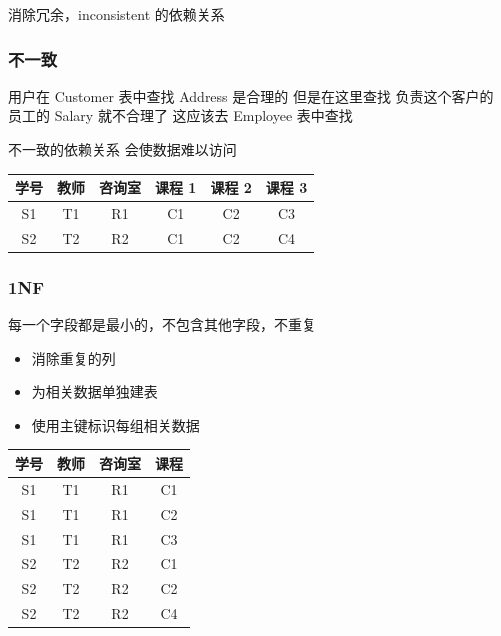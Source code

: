 \documentclass[11pt,journal,compsoc]{IEEEtran}
\begin{document}
消除冗余，inconsistent 的依赖关系


\subsubsection{不一致}

用户在 Customer 表中查找 Address 是合理的  
但是在这里查找 负责这个客户的 员工的 Salary 就不合理了  
这应该去 Employee 表中查找

不一致的依赖关系 会使数据难以访问

\begin{table}[H]
    \centering
    \begin{tabular}{|c|c|c|c|c|c|}
        \hline
        学号 & 教师 & 咨询室 & 课程 1 & 课程 2 & 课程 3 \\
        \hline
        S1 & T1 & R1 & C1 & C2 & C3 \\
        \hline
        S2 & T2 & R2 & C1 & C2 & C4 \\
        \hline
    \end{tabular}
\end{table}


\subsubsection{1NF}

每一个字段都是最小的，不包含其他字段，不重复

\begin{itemize}
    \item 消除重复的列
    \item 为相关数据单独建表
    \item 使用主键标识每组相关数据
\end{itemize}

\begin{table}[H]
    \centering
    \begin{tabular}{|c|c|c|c|}
        \hline
        学号 & 教师 & 咨询室 & 课程 \\
        \hline
        S1 & T1 & R1 & C1 \\
        \hline
        S1 & T1 & R1 & C2 \\
        \hline
        S1 & T1 & R1 & C3 \\
        \hline
        S2 & T2 & R2 & C1 \\
        \hline
        S2 & T2 & R2 & C2 \\
        \hline
        S2 & T2 & R2 & C4 \\
        \hline
    \end{tabular}
\end{table}
\end{document}
